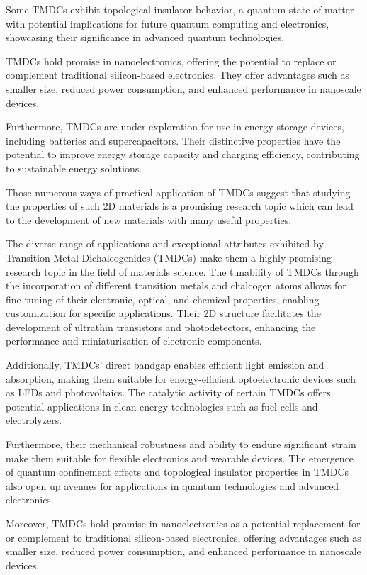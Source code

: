Some TMDCs exhibit topological insulator behavior, a quantum state of matter with potential implications for future quantum computing and electronics, showcasing their significance in advanced quantum technologies.

TMDCs hold promise in nanoelectronics, offering the potential to replace or complement traditional silicon-based electronics. They offer advantages such as smaller size, reduced power consumption, and enhanced performance in nanoscale devices.

Furthermore, TMDCs are under exploration for use in energy storage devices, including batteries and supercapacitors. Their distinctive properties have the potential to improve energy storage capacity and charging efficiency, contributing to sustainable energy solutions.

Those numerous ways of practical application of TMDCs suggest that studying the properties of such 2D materials is a promising research topic which can lead to the development of new materials with many useful properties.

The diverse range of applications and exceptional attributes exhibited by Transition Metal Dichalcogenides (TMDCs) make them a highly promising research topic in the field of materials science. The tunability of TMDCs through the incorporation of different transition metals and chalcogen atoms allows for fine-tuning of their electronic, optical, and chemical properties, enabling customization for specific applications. Their 2D structure facilitates the development of ultrathin transistors and photodetectors, enhancing the performance and miniaturization of electronic components. 

Additionally, TMDCs' direct bandgap enables efficient light emission and absorption, making them suitable for energy-efficient optoelectronic devices such as LEDs and photovoltaics. The catalytic activity of certain TMDCs offers potential applications in clean energy technologies such as fuel cells and electrolyzers. 

Furthermore, their mechanical robustness and ability to endure significant strain make them suitable for flexible electronics and wearable devices. The emergence of quantum confinement effects and topological insulator properties in TMDCs also open up avenues for applications in quantum technologies and advanced electronics. 

Moreover, TMDCs hold promise in nanoelectronics as a potential replacement for or complement to traditional silicon-based electronics, offering advantages such as smaller size, reduced power consumption, and enhanced performance in nanoscale devices. 

